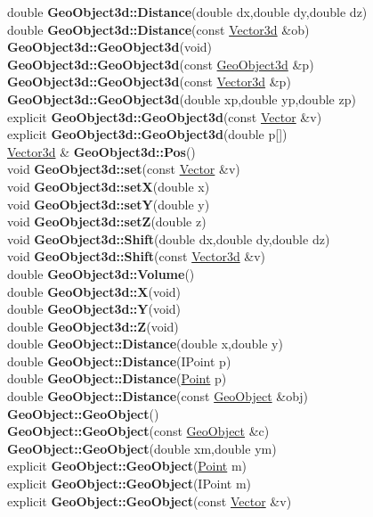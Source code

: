 \documentclass[10pt,titlepage]{article}
\def\functionlistentry#1#2#3#4#5#6{\noindent #1 {\bf #2}(#3) \dotfill #6\\}
\def\letterref#1{}
\def\letterlabelend#1{}
\begin{document}
{{\letterref{Ga}
\letterref{Ge}
\letterref{Gr}
\letterlabelend{Ge}
\functionlistentry{double}{GeoObject3d::Distance}{double dx,double dy,double dz}{646}{geoObject3d}{}
\functionlistentry{double}{GeoObject3d::Distance}{const \hyperlink{Vector3d}{Vector3d} \&ob}{647}{geoObject3d}{}
\functionlistentry{}{GeoObject3d::GeoObject3d}{void}{630}{geoObject3d}{}
\functionlistentry{}{GeoObject3d::GeoObject3d}{const \hyperlink{GeoObject3d}{GeoObject3d} \&p}{631}{geoObject3d}{}
\functionlistentry{}{GeoObject3d::GeoObject3d}{const \hyperlink{Vector3d}{Vector3d} \&p}{632}{geoObject3d}{}
\functionlistentry{}{GeoObject3d::GeoObject3d}{double xp,double yp,double zp}{633}{geoObject3d}{}
\functionlistentry{explicit}{GeoObject3d::GeoObject3d}{const \hyperlink{Vector}{Vector} \&v}{634}{geoObject3d}{}
\functionlistentry{explicit}{GeoObject3d::GeoObject3d}{double p[]}{635}{geoObject3d}{}
\functionlistentry{\hyperlink{Vector3d}{Vector3d} \&}{GeoObject3d::Pos}{}{643}{geoObject3d}{}
\functionlistentry{void}{GeoObject3d::set}{const \hyperlink{Vector}{Vector} \&v}{642}{geoObject3d}{}
\functionlistentry{void}{GeoObject3d::setX}{double x}{639}{geoObject3d}{}
\functionlistentry{void}{GeoObject3d::setY}{double y}{640}{geoObject3d}{}
\functionlistentry{void}{GeoObject3d::setZ}{double z}{641}{geoObject3d}{}
\functionlistentry{void}{GeoObject3d::Shift}{double dx,double dy,double dz}{644}{geoObject3d}{}
\functionlistentry{void}{GeoObject3d::Shift}{const \hyperlink{Vector3d}{Vector3d} \&v}{645}{geoObject3d}{}
\functionlistentry{double}{GeoObject3d::Volume}{}{648}{geoObject3d}{}
\functionlistentry{double}{GeoObject3d::X}{void}{636}{geoObject3d}{}
\functionlistentry{double}{GeoObject3d::Y}{void}{637}{geoObject3d}{}
\functionlistentry{double}{GeoObject3d::Z}{void}{638}{geoObject3d}{}
\functionlistentry{double}{GeoObject::Distance}{double x,double y}{507}{geoObject}{}
\functionlistentry{double}{GeoObject::Distance}{IPoint p}{508}{geoObject}{}
\functionlistentry{double}{GeoObject::Distance}{\hyperlink{Point}{Point} p}{509}{geoObject}{}
\functionlistentry{double}{GeoObject::Distance}{const \hyperlink{GeoObject}{GeoObject} \&obj}{510}{geoObject}{}
\functionlistentry{}{GeoObject::GeoObject}{}{497}{geoObject}{}
\functionlistentry{}{GeoObject::GeoObject}{const \hyperlink{GeoObject}{GeoObject} \&c}{498}{geoObject}{}
\functionlistentry{}{GeoObject::GeoObject}{double xm,double ym}{499}{geoObject}{}
\functionlistentry{explicit}{GeoObject::GeoObject}{\hyperlink{Point}{Point} m}{500}{geoObject}{}
\functionlistentry{explicit}{GeoObject::GeoObject}{IPoint m}{501}{geoObject}{}
\functionlistentry{explicit}{GeoObject::GeoObject}{const \hyperlink{Vector}{Vector} \&v}{502}{geoObject}{}
}}
\end{document}

